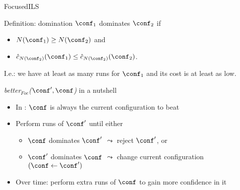 \begin{frame}[c,fragile]{FocusedILS}


\begin{block}{Definition: domination}
\alert{$\conf_1$ dominates $\conf_2$} if 
\begin{itemize}
\item $N(\conf_1) \ge N(\conf_2)$ and 
\item $\hat{c}_{N(\conf_2)}(\conf_1) \le \hat{c}_{N(\conf_2)}(\conf_2)$.
\end{itemize}
I.e.: we have at least as many runs for $\conf_1$ and its cost is at least as low.
\end{block}

\pause

\begin{block}{\textit{better$_{Foc}$($\conf', \conf$)} in a nutshell}
\begin{itemize}
\item In \paramils{}: $\conf$ is always the current configuration to beat
\pause
\item Perform runs of $\conf'$ until either
\begin{itemize}
\item $\conf$ dominates $\conf'$ $\leadsto$ reject $\conf'$, or
\item $\conf'$ dominates $\conf$ $\leadsto$ change current configuration $(\conf \leftarrow \conf')$
\end{itemize}
\pause	
\item Over time: perform extra runs of $\conf$ to gain more confidence in it
\end{itemize}
\end{block}

\end{frame}



